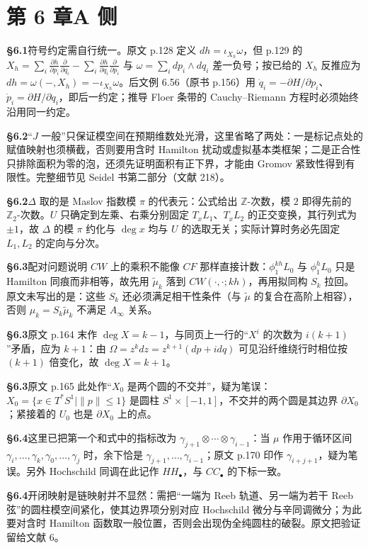 \section*{第 6 章\quad A 侧}
\noindent\textbf{§6.1}\quad 符号约定需自行统一。原文 p.128 定义 $dh=\iota_{X_h}\omega$，但 p.129 的 $X_h=\sum_i\frac{\partial h}{\partial p_i}\frac{\partial}{\partial q_i}-\sum_i\frac{\partial h}{\partial q_i}\frac{\partial}{\partial p_i}$ 与 $\omega=\sum_i dp_i\wedge dq_i$ 差一负号；按已给的 $X_h$ 反推应为 $dh=\omega(-,X_h)=-\iota_{X_h}\omega$。后文例 6.56（原书 p.156）用 $\dot q_i=-\partial H/\partial p_i$、$\dot p_i=\partial H/\partial q_i$，即后一约定；推导 Floer 条带的 Cauchy--Riemann 方程时必须始终沿用同一约定。\par\medskip
\noindent\textbf{§6.2}\quad “$J$ 一般”只保证模空间在预期维数处光滑，这里省略了两处：一是标记点处的赋值映射也须横截，否则要用含时 Hamilton 扰动或虚拟基本类框架；二是正合性只排除面积为零的泡，还须先证明面积有正下界，才能由 Gromov 紧致性得到有限性。完整细节见 Seidel 书第二部分（文献 218）。\par\medskip
\noindent\textbf{§6.2}\quad $\Delta$ 取的是 Maslov 指数模 $\pi$ 的代表元：公式给出 $\mathbb Z$-次数，模 $2$ 即得先前的 $\mathbb Z_2$-次数。$U$ 只确定到左乘、右乘分别固定 $T_xL_1$、$T_xL_2$ 的正交变换，其行列式为 $\pm1$，故 $\Delta$ 的模 $\pi$ 约化与 $\deg x$ 均与 $U$ 的选取无关；实际计算时务必先固定 $L_1,L_2$ 的定向与分次。\par\medskip
\noindent\textbf{§6.3}\quad 配对问题说明 $CW$ 上的乘积不能像 $CF$ 那样直接计数：$\phi_1^{kh}L_0$ 与 $\phi_1^hL_0$ 只是 Hamilton 同痕而非相等，故先用 $\widetilde\mu_k$ 落到 $CW(\cdot,\cdot;kh)$，再用拟同构 $S_k$ 拉回。原文未写出的是：这些 $S_k$ 还必须满足相干性条件（与 $\widetilde\mu$ 的复合在高阶上相容），否则 $\mu_k=S_k\widetilde\mu_k$ 不满足 $A_\infty$ 关系。\par\medskip
\noindent\textbf{§6.3}\quad 原文 p.164 末作 $\deg X=k-1$，与同页上一行的“$X^i$ 的次数为 $i(k+1)$”矛盾，应为 $k+1$：由 $\Omega=z^kdz=z^{k+1}(dp+idq)$ 可见沿纤维绕行时相位按 $(k+1)$ 倍变化，故 $\deg X=k+1$。\par\medskip
\noindent\textbf{§6.3}\quad 原文 p.165 此处作“$X_0$ 是两个圆的不交并”，疑为笔误：$X_0=\{x\in T^*S^1\mid\|p\|\le1\}$ 是圆柱 $S^1\times[-1,1]$，不交并的两个圆是其边界 $\partial X_0$；紧接着的 $U_0$ 也是 $\partial X_0$ 上的点。\par\medskip
\noindent\textbf{§6.4}\quad 这里已把第一个和式中的指标改为 $\gamma_{j+1}\otimes\cdots\otimes\gamma_{i-1}$：当 $\mu$ 作用于循环区间 $\gamma_i,\ldots,\gamma_k,\gamma_0,\ldots,\gamma_j$ 时，余下恰是 $\gamma_{j+1},\ldots,\gamma_{i-1}$；原文 p.170 印作 $\gamma_{i+j+1}$，疑为笔误。另外 Hochschild 同调在此记作 $HH_\bullet$，与 $CC_\bullet$ 的下标一致。\par\medskip
\noindent\textbf{§6.4}\quad 开闭映射是链映射并不显然：需把“一端为 Reeb 轨道、另一端为若干 Reeb 弦”的圆柱模空间紧化，使其边界项分别对应 Hochschild 微分与辛同调微分；为此要对含时 Hamilton 函数取一般位置，否则会出现伪全纯圆柱的破裂。原文把验证留给文献 6。\par\medskip
